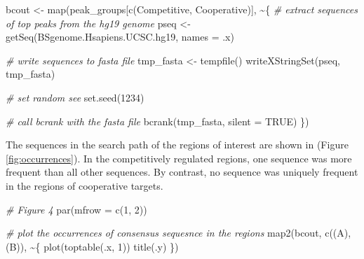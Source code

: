 \documentclass[9pt,a4paper,]{extarticle}
\newenvironment{Shaded}{\begin{snugshade}}{\end{snugshade}}
\newcommand{\AttributeTok}[1]{\textcolor[rgb]{0.77,0.63,0.00}{#1}}
\newcommand{\CommentTok}[1]{\textcolor[rgb]{0.56,0.35,0.01}{\textit{#1}}}
\newcommand{\ConstantTok}[1]{\textcolor[rgb]{0.00,0.00,0.00}{#1}}
\newcommand{\DecValTok}[1]{\textcolor[rgb]{0.00,0.00,0.81}{#1}}
\newcommand{\FunctionTok}[1]{\textcolor[rgb]{0.00,0.00,0.00}{#1}}
\newcommand{\NormalTok}[1]{#1}
\newcommand{\OtherTok}[1]{\textcolor[rgb]{0.56,0.35,0.01}{#1}}
\newcommand{\SpecialCharTok}[1]{\textcolor[rgb]{0.00,0.00,0.00}{#1}}
\newcommand{\StringTok}[1]{\textcolor[rgb]{0.31,0.60,0.02}{#1}}
\begin{document}
\begin{Shaded}
\begin{Highlighting}[]
\NormalTok{bcout }\OtherTok{\textless{}{-}} \FunctionTok{map}\NormalTok{(peak\_groups[}\FunctionTok{c}\NormalTok{(}\StringTok{\textquotesingle{}Competitive\textquotesingle{}}\NormalTok{, }\StringTok{\textquotesingle{}Cooperative\textquotesingle{}}\NormalTok{)], }\SpecialCharTok{\textasciitilde{}}\NormalTok{\{}
    \CommentTok{\# extract sequences of top peaks from the hg19 genome}
\NormalTok{    pseq }\OtherTok{\textless{}{-}} \FunctionTok{getSeq}\NormalTok{(BSgenome.Hsapiens.UCSC.hg19, }\AttributeTok{names =}\NormalTok{ .x)}
                 
    \CommentTok{\# write sequences to fasta file}
\NormalTok{    tmp\_fasta }\OtherTok{\textless{}{-}} \FunctionTok{tempfile}\NormalTok{()}
    \FunctionTok{writeXStringSet}\NormalTok{(pseq, tmp\_fasta)}
                 
    \CommentTok{\# set random see}
    \FunctionTok{set.seed}\NormalTok{(}\DecValTok{1234}\NormalTok{)}
                  
    \CommentTok{\# call bcrank with the fasta file}
    \FunctionTok{bcrank}\NormalTok{(tmp\_fasta, }\AttributeTok{silent =} \ConstantTok{TRUE}\NormalTok{)}
\NormalTok{\})}
\end{Highlighting}
\end{Shaded}

The sequences in the search path of the regions of interest are shown in (Figure \ref{fig:occurrences}). In the competitively regulated regions, one sequence was more frequent than all other sequences. By contrast, no sequence was uniquely frequent in the regions of cooperative targets.

\begin{Shaded}
\begin{Highlighting}[]
\CommentTok{\# Figure 4}
\FunctionTok{par}\NormalTok{(}\AttributeTok{mfrow =} \FunctionTok{c}\NormalTok{(}\DecValTok{1}\NormalTok{, }\DecValTok{2}\NormalTok{))}

\CommentTok{\# plot the occurrences of consensus sequesnce in the regions}
\FunctionTok{map2}\NormalTok{(bcout, }\FunctionTok{c}\NormalTok{(}\StringTok{\textquotesingle{}(A)\textquotesingle{}}\NormalTok{, }\StringTok{\textquotesingle{}(B)\textquotesingle{}}\NormalTok{), }\SpecialCharTok{\textasciitilde{}}\NormalTok{\{}
    \FunctionTok{plot}\NormalTok{(}\FunctionTok{toptable}\NormalTok{(.x, }\DecValTok{1}\NormalTok{))}
    \FunctionTok{title}\NormalTok{(.y)}
\NormalTok{\})}
\end{Highlighting}
\end{Shaded}
\end{document}
